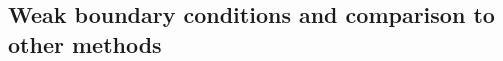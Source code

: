 \documentclass[final,leqno]{siamltex}
\begin{document}
%
%
%
%
%

\subsection{Weak boundary conditions and comparison to other methods}
\end{document}
